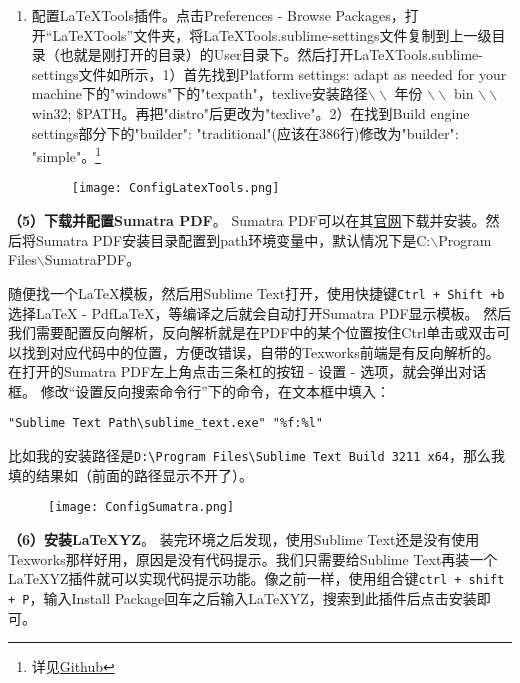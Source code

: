 \documentclass[lang=cn,11pt,a4paper]{elegantpaper}
\begin{document}
\begin{enumerate}
  \item 配置LaTeXTools插件。点击Preferences - Browse Packages，打开“LaTeXTools”文件夹，将LaTeXTools.sublime-settings文件复制到上一级目录（也就是刚打开的目录）的User目录下。然后打开LaTeXTools.sublime-settings文件如所示，1）首先找到Platform settings: adapt as needed for your machine下的"windows"下的"texpath"，texlive安装路径$\backslash \backslash$ 年份 $\backslash \backslash$ bin $\backslash \backslash$ win32; \$PATH。再把"distro"后更改为"texlive"。2）在找到Build engine settings部分下的"builder": "traditional"(应该在386行)修改为"builder": "simple"。\footnote{详见\href{https://github.com/SublimeText/LaTeXTools}{Github}}
\begin{figure}[!htb]
\centering
\texttt{[image: ConfigLatexTools.png]}
\caption{}
\label{fig.ConfigLatexTools}
\end{figure}

\end{enumerate}

\textbf{（5）下载并配置Sumatra PDF}。
Sumatra PDF可以在其\href{http://www.sumatrapdfreader.org/download-free-pdf-viewer.html}{官网}下载并安装。然后将Sumatra PDF安装目录配置到path环境变量中，默认情况下是C:$\backslash$Program Files$\backslash$SumatraPDF。

随便找一个LaTeX模板，然后用Sublime Text打开，使用快捷键\lstinline{Ctrl + Shift +b}选择LaTeX - PdfLaTeX，等编译之后就会自动打开Sumatra PDF显示模板。
然后我们需要配置反向解析，反向解析就是在PDF中的某个位置按住Ctrl单击或双击可以找到对应代码中的位置，方便改错误，自带的Texworks前端是有反向解析的。在打开的Sumatra PDF左上角点击三条杠的按钮 - 设置 - 选项，就会弹出对话框。
修改“设置反向搜索命令行”下的命令，在文本框中填入：
\begin{lstlisting}
"Sublime Text Path\sublime_text.exe" "%f:%l"
\end{lstlisting}
比如我的安装路径是\lstinline{D:\Program Files\Sublime Text Build 3211 x64}，那么我填的结果如（前面的路径显示不开了）。
\begin{figure}[!htb]
\centering
\texttt{[image: ConfigSumatra.png]}
\caption{}
\label{fig.ConfigSumatra}
\end{figure}

\textbf{（6）安装LaTeXYZ}。
装完环境之后发现，使用Sublime Text还是没有使用Texworks那样好用，原因是没有代码提示。我们只需要给Sublime Text再装一个LaTeXYZ插件就可以实现代码提示功能。像之前一样，使用组合键\lstinline{ctrl + shift + P}，输入Install Package回车之后输入LaTeXYZ，搜索到此插件后点击安装即可。
\end{document}
